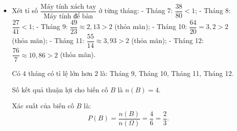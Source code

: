 \begin{bt}
{\begin{enumerate}[a)]
\begin{itemize}
				Số kết quả thuận lợi cho biến cố $A$ là $n(A) = 4$.
				
				Xác suất của biến cố $A$ là:
				$$P(A) = \dfrac{n(A)}{n(\Omega)} = \dfrac{4}{6} = \dfrac{2}{3}.$$
				\item Xét tỉ số $\dfrac{\text{Máy tính xách tay}}{\text{Máy tính để bàn}}$ ở từng tháng:
				- Tháng 7: $\dfrac{38}{80} < 1$;
				- Tháng 8: $\dfrac{27}{41} < 1$;
				- Tháng 9: $\dfrac{49}{23} \approx 2{,}13 > 2$ (thỏa mãn);
				- Tháng 10: $\dfrac{64}{20} = 3{,}2 > 2$ (thỏa mãn);
				- Tháng 11: $\dfrac{55}{14} \approx 3{,}93 > 2$ (thỏa mãn);
				- Tháng 12: $\dfrac{76}{7} \approx 10{,}86 > 2$ (thỏa mãn).
				
				Có $4$ tháng có tỉ lệ lớn hơn $2$ là: Tháng 9, Tháng 10, Tháng 11, Tháng 12.
				
				Số kết quả thuận lợi cho biến cố $B$ là $n(B) = 4$.
				
				Xác suất của biến cố $B$ là:
				$$P(B) = \dfrac{n(B)}{n(\Omega)} = \dfrac{4}{6} = \dfrac{2}{3}.$$
			\end{itemize}
		\end{enumerate}
}
\end{bt}

